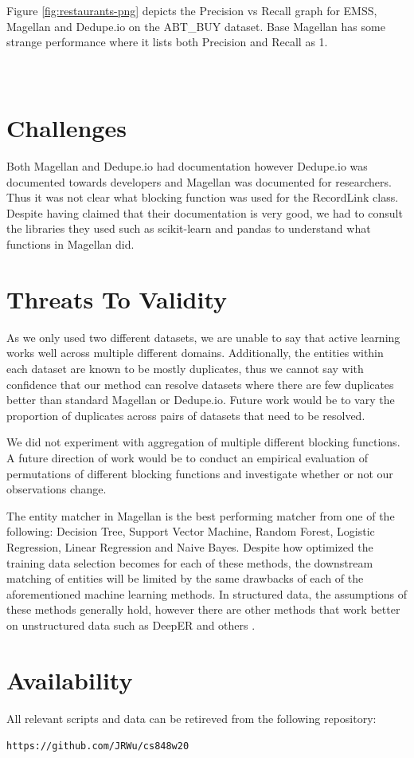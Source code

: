 \documentclass[letterpaper,twocolumn,10pt]{article}
\begin{document}
Figure \ref{fig:restaurants-png} depicts the Precision vs Recall graph for EMSS, Magellan and Dedupe.io on the ABT\_BUY dataset. Base Magellan has some strange performance where it lists both Precision and Recall as 1. \\

\noindent{}
\\\\

\section{Challenges}
Both Magellan and Dedupe.io had documentation however Dedupe.io was documented towards developers and Magellan was documented for researchers. Thus it was not clear what blocking function was used for the RecordLink class. Despite having claimed that their documentation is very good, we had to consult the libraries they used such as scikit-learn and pandas to understand what functions in Magellan did. 


\section{Threats To Validity}
As we only used two different datasets, we are unable to say that active learning works well across multiple different domains. Additionally, the entities within each dataset are known to be mostly duplicates, thus we cannot say with confidence that our method can resolve datasets where there are few duplicates better than standard Magellan or Dedupe.io. Future work would be to vary the proportion of duplicates across pairs of datasets that need to be resolved. 

We did not experiment with aggregation of multiple different blocking functions. A future direction of work would be to conduct an empirical evaluation of permutations of different blocking functions and investigate whether or not our observations change. 

The entity matcher in Magellan is the best performing matcher from one of the following: Decision Tree, Support Vector Machine, Random Forest, Logistic Regression, Linear Regression and Naive Bayes. Despite how optimized the training data selection becomes for each of these methods, the downstream matching of entities will be limited by the same drawbacks of each of the aforementioned machine learning methods. In structured data, the assumptions of these methods generally hold, however there are other methods that work better on unstructured data such as DeepER and others \cite{ebraheem2017deeper, mudgal2018deep}.

\section{Availability}\label{Availability}
All relevant scripts and data can be retireved from the following repository:
\begin{center}
{\tt https://github.com/JRWu/cs848w20}
\end{center}



{\footnotesize 


\newpage
}
\end{document}
